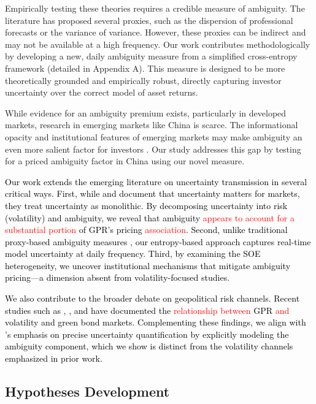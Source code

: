 \documentclass[preprint,12pt,authoryear]{elsarticle}
\begin{document}
Empirically testing these theories requires a credible measure of ambiguity. The literature has proposed several proxies, such as the dispersion of professional forecasts \citep{Brenner2018, Ulrich2013} or the variance of variance. However, these proxies can be indirect and may not be available at a high frequency. Our work contributes methodologically by developing a new, daily ambiguity measure from a simplified cross-entropy framework (detailed in Appendix A). This measure is designed to be more theoretically grounded and empirically robust, directly capturing investor uncertainty over the correct model of asset returns.

While evidence for an ambiguity premium exists, particularly in developed markets, research in emerging markets like China is scarce. The informational opacity and institutional features of emerging markets may make ambiguity an even more salient factor for investors \citep{Easley2009}. Our study addresses this gap by testing for a priced ambiguity factor in China using our novel measure.

\textcolor{black}{Our work extends the emerging literature on uncertainty transmission in several critical ways. First, while \citet{Baker2016} and \citet{Caldara2022} document that uncertainty matters for markets, they treat uncertainty as monolithic. By decomposing uncertainty into risk (volatility) and ambiguity, we reveal that ambiguity \textcolor{red}{appears to account for a substantial portion} of GPR's pricing \textcolor{red}{association}. Second, unlike traditional proxy-based ambiguity measures \citep{Brenner2018}, our entropy-based approach captures real-time model uncertainty at daily frequency. Third, by examining the SOE heterogeneity, we uncover institutional mechanisms that mitigate ambiguity pricing---a dimension absent from volatility-focused studies.}

\textcolor{black}{We also contribute to the broader debate on geopolitical risk channels. Recent studies such as \citet{Bouri2024}, \citet{Liu2024}, and \citet{Zhang2023} have documented the \textcolor{red}{relationship between} GPR \textcolor{red}{and} volatility and green bond markets. Complementing these findings, we align with \citet{Nemani2023}’s emphasis on precise uncertainty quantification by explicitly modeling the ambiguity component, which we show is distinct from the volatility channels emphasized in prior work.}

\subsection{Hypotheses Development}
\end{document}
